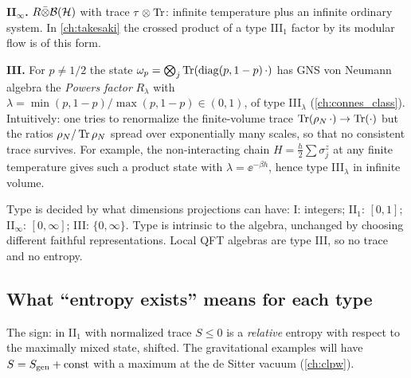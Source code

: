 \textbf{II$_\infty$.} $R\bar\otimes\mathcal{B}(\mathcal{H})$ with trace $\tau\otimes\operatorname{Tr}$: infinite temperature plus an infinite ordinary system. In \cref{ch:takesaki} the crossed product of a type III$_1$ factor by its modular flow is of this form.

\textbf{III.} For $p\ne1/2$ the state $\omega_p=\bigotimes_j\operatorname{Tr}(\mathrm{diag}(p,1-p)\,\cdot)$ has GNS von Neumann algebra the \emph{Powers factor} $R_\lambda$ with $\lambda=\min(p,1-p)/\max(p,1-p)\in(0,1)$, of type III$_\lambda$ (\cref{ch:connes_class}). Intuitively: one tries to renormalize the finite-volume trace $\operatorname{Tr}(\rho_N\,\cdot)\to\operatorname{Tr}(\cdot)$ but the ratios $\rho_N/\operatorname{Tr}\rho_N$ spread over exponentially many scales, so that no consistent trace survives. For example, the non-interacting chain $H=\frac h2\sum\sigma^z_j$ at any finite temperature gives such a product state with $\lambda=\ee^{-\beta h}$, hence type III$_\lambda$ in infinite volume.

\begin{keyidea}
Type is decided by what dimensions projections can have: I: integers; II$_1$: $[0,1]$; II$_\infty$: $[0,\infty]$; III: $\{0,\infty\}$. Type is intrinsic to the algebra, unchanged by choosing different faithful representations. Local QFT algebras are type III, so no trace and no entropy.
\end{keyidea}

\subsection{What ``entropy exists'' means for each type}

\begin{center}
\renewcommand{\arraystretch}{1.3}
\end{center}
The sign: in II$_1$ with normalized trace $S\le0$ is a \emph{relative} entropy with respect to the maximally mixed state, shifted. The gravitational examples will have $S=S_{\mathrm{gen}}+\text{const}$ with a maximum at the de Sitter vacuum (\cref{ch:clpw}).

